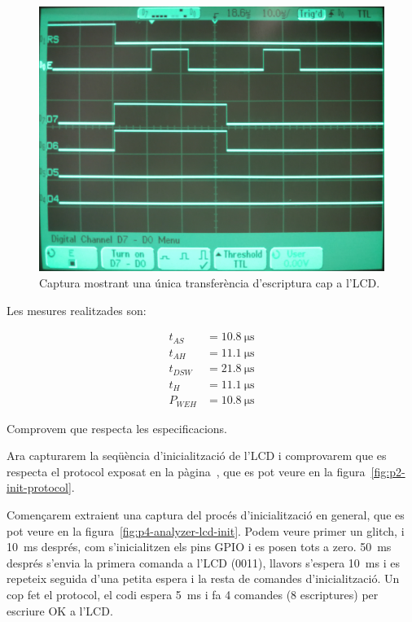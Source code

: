 \begin{figure}
  \includegraphics[width=.99\columnwidth]{../photos/analyzer/lcd-write}
  \caption{ \label{fig:p4-analyzer-lcd-write} Captura mostrant una única transferència d'escriptura cap a l'LCD. }
\end{figure}

Les mesures realitzades son:

\begin{align*}
  t_{AS} &= \SI{10.8}{\micro\second}
\\
  t_{AH} &= \SI{11.1}{\micro\second}
\\
  t_{DSW} &= \SI{21.8}{\micro\second}
\\
  t_{H} &= \SI{11.1}{\micro\second}
\\
  P_{WEH} &= \SI{10.8}{\micro\second}
\end{align*}

Comprovem que respecta les especificacions.

Ara capturarem la seqüència d'inicialització de
l'LCD i comprovarem que es respecta el protocol exposat en la pàgina~\pageref{sub:p2-init},
que es pot veure en la figura~\ref{fig:p2-init-protocol}.

Començarem extraient una captura del procés d'inicialització en general, que es pot veure
en la figura~\ref{fig:p4-analyzer-lcd-init}. Podem veure primer un glitch, i \SI{10}{\milli\second}
després, com s'inicialitzen els pins GPIO i es posen tots a zero. \SI{50}{\milli\second} després
s'envia la primera comanda a l'LCD (0011), llavors s'espera \SI{10}{\milli\second} i es repeteix seguida
d'una petita espera i la resta de comandes d'inicialització. Un cop fet el protocol,
el codi espera \SI{5}{\milli\second} i fa 4 comandes (8 escriptures) per escriure OK a l'LCD.

